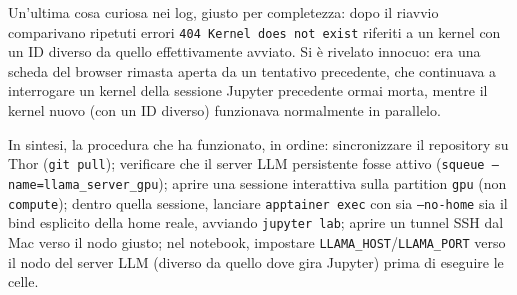 Un'ultima cosa curiosa nei log, giusto per completezza: dopo il riavvio comparivano ripetuti errori \texttt{404 Kernel does not exist} riferiti a un kernel con un ID diverso da quello effettivamente avviato. Si è rivelato innocuo: era una scheda del browser rimasta aperta da un tentativo precedente, che continuava a interrogare un kernel della sessione Jupyter precedente ormai morta, mentre il kernel nuovo (con un ID diverso) funzionava normalmente in parallelo.

In sintesi, la procedura che ha funzionato, in ordine: sincronizzare il repository su Thor (\texttt{git pull}); verificare che il server LLM persistente fosse attivo (\texttt{squeue --name=llama\_server\_gpu}); aprire una sessione interattiva sulla partition \texttt{gpu} (non \texttt{compute}); dentro quella sessione, lanciare \texttt{apptainer exec} con sia \texttt{--no-home} sia il bind esplicito della home reale, avviando \texttt{jupyter lab}; aprire un tunnel SSH dal Mac verso il nodo giusto; nel notebook, impostare \texttt{LLAMA\_HOST}/\texttt{LLAMA\_PORT} verso il nodo del server LLM (diverso da quello dove gira Jupyter) prima di eseguire le celle.
